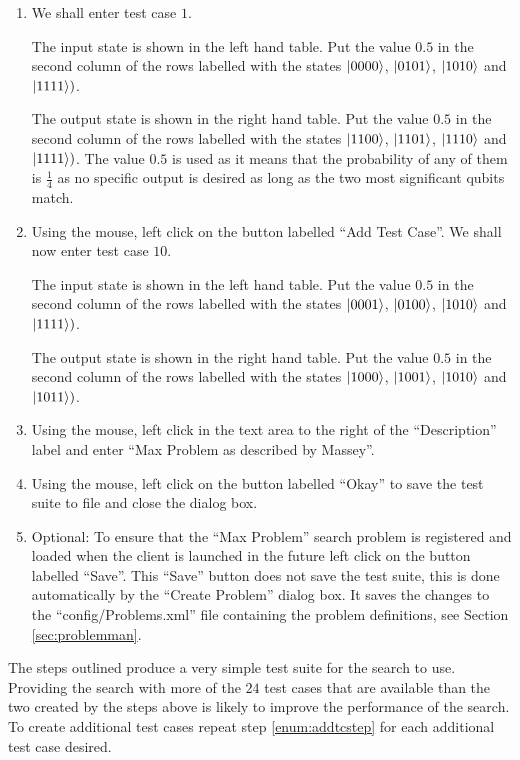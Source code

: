 \begin{enumerate}
\item We shall enter test case $1$.

The input state is shown in the left hand table.
Put the value $0.5$ in the second column of the rows labelled with the states $\left\vert{0000}\right\rangle$, $\left\vert{0101}\right\rangle$, $\left\vert{1010}\right\rangle$ and $\left\vert{1111}\right\rangle)$.

The output state is shown in the right hand table.
Put the value $0.5$ in the second column of the rows labelled with the states $\left\vert{1100}\right\rangle$, $\left\vert{1101}\right\rangle$, $\left\vert{1110}\right\rangle$ and $\left\vert{1111}\right\rangle)$.
The value $0.5$ is used as it means that the probability of any of them is $\frac{1}{4}$ as no specific output is desired as long as the two most significant qubits match.

\item \label{enum:addtcstep} Using the mouse, left click on the button labelled ``Add Test Case''.
We shall now enter test case $10$.

The input state is shown in the left hand table.
Put the value $0.5$ in the second column of the rows labelled with the states $\left\vert{0001}\right\rangle$, $\left\vert{0100}\right\rangle$, $\left\vert{1010}\right\rangle$ and $\left\vert{1111}\right\rangle)$.

The output state is shown in the right hand table.
Put the value $0.5$ in the second column of the rows labelled with the states $\left\vert{1000}\right\rangle$, $\left\vert{1001}\right\rangle$, $\left\vert{1010}\right\rangle$ and $\left\vert{1011}\right\rangle)$.

\item Using the mouse, left click in the text area to the right of the ``Description'' label and enter ``Max Problem as described by Massey''.

\item Using the mouse, left click on the button labelled ``Okay'' to save the test suite to file and close the dialog box.

\item \label{enum:createsaveprobs}Optional: To ensure that the ``Max Problem'' search problem is registered and loaded when the client is launched in the future left click on the button labelled ``Save''.
This ``Save'' button does not save the test suite, this is done automatically by the ``Create Problem'' dialog box.
It saves the changes to the ``config/Problems.xml'' file containing the problem definitions, see Section \ref{sec:problemman}.
\end{enumerate}

The steps outlined produce a very simple test suite for the search to use.
Providing the search with more of the $24$ test cases that are available than the two created by the steps above is likely to improve the performance of the search.
To create additional test cases repeat step \ref{enum:addtcstep} for each additional test case desired.

